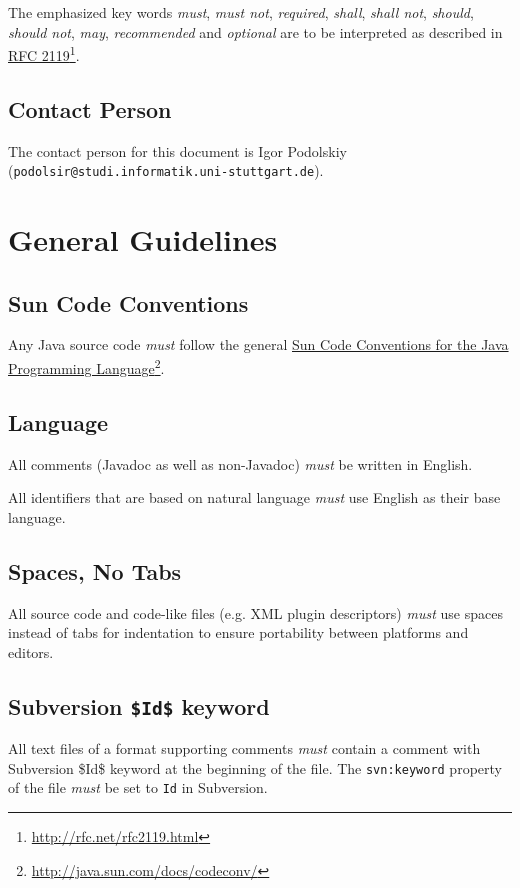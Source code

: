 \documentclass[a4paper,12pt,liststotoc,DIV12]{scrartcl}
\newcommand{\linkwithfootnote}[2]{\href{#1}{#2}\footnote{\url{#1}}}
\begin{document}
The emphasized key words \emph{must}, \emph{must not}, \emph{required},
\emph{shall}, \emph{shall not}, \emph{should}, \emph{should not}, \emph{may},
\emph{recommended} and \emph{optional} are to be interpreted as described in
\linkwithfootnote{http://rfc.net/rfc2119.html}{RFC 2119}.


\subsection{Contact Person}
\label{sec:contact-person}

The contact person for this document is Igor Podolskiy
(\texttt{podolsir@studi.informatik.uni-stuttgart.de}).

\section{General Guidelines}
\label{sec:general-guidelines}


\subsection{Sun Code Conventions}
\label{sec:general:sun}
Any Java source code \emph{must} follow the general
\linkwithfootnote{http://java.sun.com/docs/codeconv/}{Sun Code Conventions for
  the Java Programming Language}.

\subsection{Language}
\label{sec:javadoc:language}
All comments (Javadoc as well as non-Javadoc) \emph{must} be written in English.

All identifiers that are based on natural language \emph{must} use
English as their base language.

\subsection{Spaces, No Tabs}
\label{sec:general:spaces-no-tabs}
All source code and code-like files (e.g. XML plugin descriptors) \emph{must}
use spaces instead of tabs for indentation to ensure portability between
platforms and editors.

\subsection{Subversion \texttt{\$Id\$} keyword}
\label{sec:general:subversion-id}
All text files of a format supporting comments \emph{must} contain a comment
with Subversion \$Id\$ keyword at the beginning of the file. The
\texttt{svn:keyword} property of the file \emph{must} be set to \texttt{Id} in
Subversion.
\end{document}
